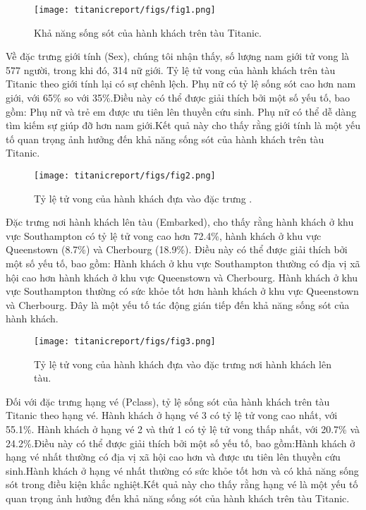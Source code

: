 \documentclass[11pt]{article}
\begin{document}
\begin{figure}[ht]
    \centering
    \texttt{[image: titanicreport/figs/fig1.png]}
    \caption{Khả năng sống sót của hành khách trên tàu Titanic.}

\end{figure}
Về  đặc trưng giới tính (Sex), chúng tôi nhận thấy, số lượng nam giới tử vong  là 577 người, trong khi đó, 314 nữ giới. Tỷ lệ tử vong của hành khách trên tàu Titanic theo giới tính lại có sự chênh lệch. Phụ nữ có tỷ lệ sống sót cao hơn nam giới, với 65\% so với 35\%.Điều này có thể được giải thích bởi một số yếu tố, bao gồm: Phụ nữ và trẻ em được ưu tiên lên thuyền cứu sinh. Phụ nữ có thể dễ dàng tìm kiếm sự giúp đỡ hơn nam giới.Kết quả này cho thấy rằng giới tính là một yếu tố quan trọng ảnh hưởng đến khả năng sống sót của hành khách trên tàu Titanic.\\
\begin{figure}[ht]
    \centering
    \texttt{[image: titanicreport/figs/fig2.png]}
    \caption{Tỷ lệ tử vong của hành khách đựa vào đặc trưng .}
 
\end{figure}
Đặc trưng nơi hành khách lên tàu (Embarked), cho thấy rằng hành khách ở khu vực Southampton có tỷ lệ tử vong cao hơn 72.4\%, hành khách ở khu vực Queenstown (8.7\%) và Cherbourg (18.9\%). Điều này có thể được giải thích bởi một số yếu tố, bao gồm: Hành khách ở khu vực Southampton thường có địa vị xã hội cao hơn hành khách ở khu vực Queenstown và Cherbourg. Hành khách ở khu vực Southampton thường có sức khỏe tốt hơn hành khách ở khu vực Queenstown và Cherbourg. Đây là một yếu tố tác động gián tiếp đến khả năng sống sót của hành khách.\\
\begin{figure}[ht]
    \centering
    \texttt{[image: titanicreport/figs/fig3.png]}
    \caption{Tỷ lệ tử vong của hành khách đựa vào đặc trưng nơi hành khách lên tàu.}
    
\end{figure}
Đối với đặc trưng hạng vé (Pclass), tỷ lệ sống sót của hành khách trên tàu Titanic theo hạng vé. Hành khách ở hạng vé 3 có tỷ lệ tử vong cao nhất, với 55.1\%. Hành khách ở hạng vé 2  và thứ 1 có tỷ lệ tử vong thấp nhất, với 20.7\% và 24.2\%.Điều này có thể được giải thích bởi một số yếu tố, bao gồm:Hành khách ở hạng vé nhất thường có địa vị xã hội cao hơn và được ưu tiên lên thuyền cứu sinh.Hành khách ở hạng vé nhất thường có sức khỏe tốt hơn và có khả năng sống sót trong điều kiện khắc nghiệt.Kết quả này cho thấy rằng hạng vé là một yếu tố quan trọng ảnh hưởng đến khả năng sống sót của hành khách trên tàu Titanic.\\
\end{document}
